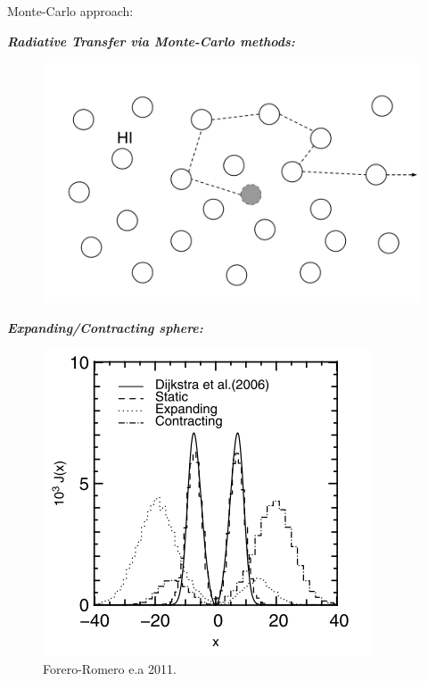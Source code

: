 \documentclass{beamer}
\begin{document}
\begin{frame}
\LARGE{Monte-Carlo approach:}
\end{frame}

\begin{frame}{\textit{\textbf{Radiative Transfer via Monte-Carlo methods:}}}
\begin{figure}
\includegraphics[scale=0.3]{Figures/RT.png}
\end{figure}
\end{frame}



\begin{frame}{\textit{\textbf{Expanding/Contracting sphere:}}}
\begin{figure}
\includegraphics[scale=0.5]{Figures/expanding.png}
\caption*{Forero-Romero e.a 2011.}
\end{figure}
\end{frame}
\end{document}
